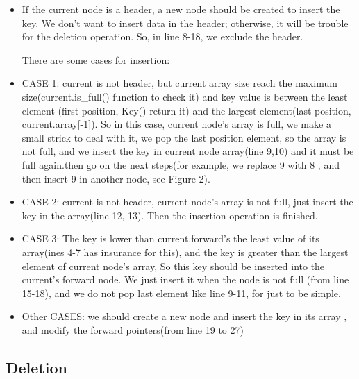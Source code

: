 \documentclass{article}
\begin{document}
\begin{itemize}


\item  If the current node is a header, a new node should be created to insert the key. We don’t want to insert data in the header; otherwise, it will be trouble for the deletion operation. So, in line 8-18, we exclude the header.
  
There are some cases for insertion:

\item CASE 1: current is not header, but current array size reach the maximum size(current.is\_full() function to check it) and key value is between the least element (first position, Key() return it) and the largest element(last position, current.array[-1]). So in this case, current node’s array is full, we make a small strick to deal with it, we pop the last position element, so the array is not full, and we insert the key in current node array(line 9,10) and it must be full again.then go on the next steps(for example, we replace 9 with 8 , and then insert 9 in another node, see Figure 2).

\item CASE 2: current is not header, current node’s array is not full, just insert the key in the array(line 12, 13). Then the insertion operation is finished.

\item CASE 3: The key is lower than current.forward’s the least value of its array(ines 4-7 has insurance for this), and the key is greater than the largest element of current node’s array, So this key should be inserted into the current’s forward node. We just insert it when the node is not full (from line 15-18), and we do not pop last element like line 9-11, for just to be simple.
\item Other CASES:  we should create a new node and insert the key in its array , and modify the forward pointers(from line 19 to 27)
\end{itemize}

\subsection{Deletion}
\end{document}
